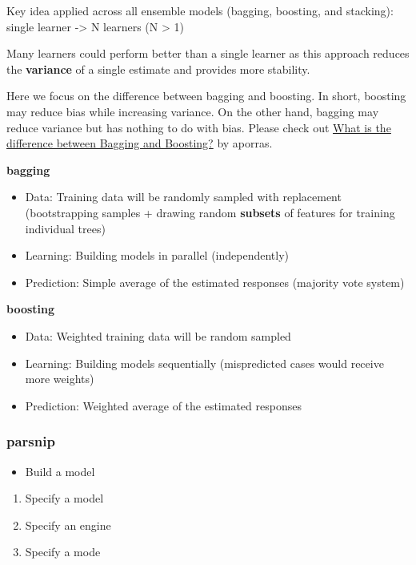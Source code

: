 \documentclass[
]{book}
\providecommand{\tightlist}{%
  \setlength{\itemsep}{0pt}\setlength{\parskip}{0pt}}
\begin{document}
Key idea applied across all ensemble models (bagging, boosting, and stacking):
single learner -\textgreater{} N learners (N \textgreater{} 1)

Many learners could perform better than a single learner as this approach reduces the \textbf{variance} of a single estimate and provides more stability.

Here we focus on the difference between bagging and boosting. In short, boosting may reduce bias while increasing variance. On the other hand, bagging may reduce variance but has nothing to do with bias. Please check out \href{https://quantdare.com/what-is-the-difference-between-bagging-and-boosting/}{What is the difference between Bagging and Boosting?} by aporras.

\textbf{bagging}

\begin{itemize}
\item
  Data: Training data will be randomly sampled with replacement (bootstrapping samples + drawing random \textbf{subsets} of features for training individual trees)
\item
  Learning: Building models in parallel (independently)
\item
  Prediction: Simple average of the estimated responses (majority vote system)
\end{itemize}

\textbf{boosting}

\begin{itemize}
\item
  Data: Weighted training data will be random sampled
\item
  Learning: Building models sequentially (mispredicted cases would receive more weights)
\item
  Prediction: Weighted average of the estimated responses
\end{itemize}

\subsubsection{parsnip}\label{parsnip-2}

\begin{itemize}
\tightlist
\item
  Build a model
\end{itemize}

\begin{enumerate}
\def\labelenumi{\arabic{enumi}.}
\tightlist
\item
  Specify a model
\item
  Specify an engine
\item
  Specify a mode
\end{enumerate}
\end{document}

